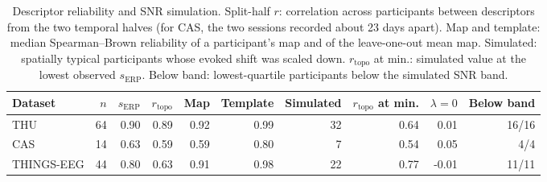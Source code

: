 \begin{table}[H]
\centering
\caption{Descriptor reliability and SNR simulation. Split-half $r$: correlation across participants between descriptors from the two temporal halves (for CAS, the two sessions recorded about 23 days apart). Map and template: median Spearman--Brown reliability of a participant's map and of the leave-one-out mean map. Simulated: spatially typical participants whose evoked shift was scaled down. $r_\mathrm{topo}$ at min.: simulated value at the lowest observed $s_\mathrm{ERP}$. Below band: lowest-quartile participants below the simulated SNR band.}
\label{tab:supp-reliability}
\scriptsize
\begin{adjustbox}{max width=\textwidth}
\begin{tabular}{@{}lrrrrrrrrr@{}}
\toprule
Dataset & $n$ & $s_\mathrm{ERP}$ & $r_\mathrm{topo}$ & Map & Template & Simulated & $r_\mathrm{topo}$ at min. & $\lambda=0$ & Below band \\
\midrule
THU & 64 & 0.90 & 0.89 & 0.92 & 0.99 & 32 & 0.64 & 0.01 & 16/16 \\
CAS & 14 & 0.63 & 0.59 & 0.59 & 0.80 & 7 & 0.54 & 0.05 & 4/4 \\
THINGS-EEG & 44 & 0.80 & 0.63 & 0.91 & 0.98 & 22 & 0.77 & -0.01 & 11/11 \\
\bottomrule
\end{tabular}
\end{adjustbox}
\end{table}
